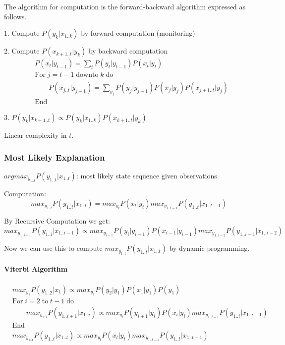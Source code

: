 \documentclass[12pt]{article}
\begin{document}
            The algorithm for computation is the forward-backward algorithm expressed as follows.
            
            1. Compute $P(y_k|x_{1..k})$ by forward computation (monitoring)

            2. Compute $P(x_{k+1..t}|y_k)$ by backward computation
            \begin{align*}
                & P(x_t|y_{t-1}) = \sum_t P(y_t|y_{t-1})P(x_t|y_t) \\
                & \text{For} \; j=t-1 \; \text{downto} \; k \; \text{do} \\
                & \qquad P(x_{j..t}|y_{j-1}) = \sum_{y_j} P(y_j|y_{j-1}) P(x_{j}|y_{j})P(x_{j+1..t}|y_{j}) \\
                & \text{End}
            \end{align*}
            
            3. $P(y_k|x_{k+1..t}) \propto P(y_k|x_{1..k})P(x_{k+1..t}|y_k)$

            Linear complexity in $t$.
        
        \subsubsection{Most Likely Explanation}
            $argmax_{y_{1..t}} P(y_{1..t}|x_{1..t})$: most likely state sequence given observations.

            Computation:
            $$ max_{y_{1..t}} P(y_{1..t}|x_{1..t}) = max_{y_t} P(x_t|y_t) max_{y_{1..t-1}} P(y_{1..t}|x_{1..t-1}) $$

            By Recursive Computation we get:
            $$ max_{y_{1..i-1}} P(y_{1..i}|x_{1..i-1}) \propto max_{y_{i-1}} P(y_i|y_{i-1})P(x_{i-1}|y_{i-1})
            max_{y_{1..i-2}} P(y_{1..i-1}|x_{1..i-2}) $$ 
        
            Now we can use this to compute $max_{y_{1..t}} P(y_{1..t}|x_{1..t})$ by dynamic programming.

            \paragraph{Viterbi Algorithm}
                \begin{align*}
                    & max_{y_1} P(y_{1..2}|x_1) \propto max_{y_1} P(y_2|y_1)P(x_1|y_1)P(y_1) \\
                    & \text{For} \; i=2 \; \text{to} \; t-1 \; \text{do} \\
                    & \qquad max_{y_{1..i}} P(y_{1..i+1}|x_{1..i}) \propto max_{y_i} P(y_{i+1}|y_i)P(x_i|y_i) max_{y_{1..i-1}} P(y_{1..i} | x_{1..i-1}) \\
                    & \text{End} \\
                    & max_{y_{1..t}} P(y_{1..t}|x_{1..t}) \propto max_{y_t} P(x_t|y_t) max_{y_{1..t-1}} P(y_{1..t}|x_{1..t-1})
                \end{align*}
                
\end{document}
